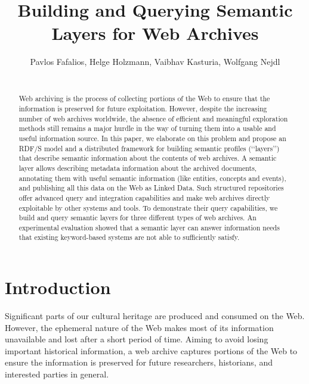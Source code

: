\documentclass{libtex/sig-alternate-05-2015}
\newcommand{\q}[1]{\lq\lq{}{}#1\rq\rq{}{}}
\begin{document}



\title{Building and Querying Semantic Layers for Web Archives}

\author{
Pavlos Fafalios, Helge Holzmann, Vaibhav Kasturia, Wolfgang Nejdl\\
\\
}

\maketitle


\begin{abstract}
Web archiving is the process of collecting portions of the Web
to ensure that the information is preserved
for future exploitation.
However, despite the increasing number of web archives worldwide,
the absence of efficient and meaningful exploration methods still remains a major
hurdle in the way of turning them into a usable and useful information source.
In this paper, we elaborate on this problem and
propose an RDF/S model and a distributed framework for
building semantic profiles (\q{layers}) that describe
semantic information about the contents of web archives.
A semantic layer allows
describing metadata information about the archived documents,
annotating them with useful semantic information (like entities, concepts and events), and
publishing all this data on the Web as Linked Data.
Such structured repositories
offer advanced query and integration capabilities
and make web archives directly exploitable by other systems and tools.
To demonstrate their query capabilities,
we build and query semantic layers for three different types of
web archives.
An experimental evaluation showed that a semantic layer
can answer information needs that existing keyword-based systems
are not able to sufficiently satisfy.
\end{abstract}


\section{Introduction}
Significant parts of our cultural heritage are produced and consumed on the Web.
However, the ephemeral nature of the Web makes most of its information
unavailable and lost after a short period of time.
Aiming to avoid losing important historical information,
a web archive captures portions of the Web to ensure the information
is preserved for future researchers, historians,
and interested parties in general.
\end{document}
